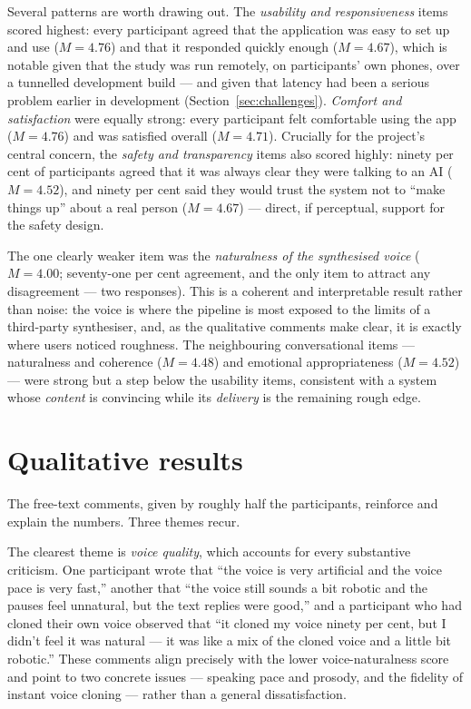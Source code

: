 \documentclass[11pt,a4paper]{report}
\begin{document}
Several patterns are worth drawing out. The \emph{usability and responsiveness} items scored highest: every participant agreed that the application was easy to set up and use ($M=4.76$) and that it responded quickly enough ($M=4.67$), which is notable given that the study was run remotely, on participants' own phones, over a tunnelled development build --- and given that latency had been a serious problem earlier in development (Section~\ref{sec:challenges}). \emph{Comfort and satisfaction} were equally strong: every participant felt comfortable using the app ($M=4.76$) and was satisfied overall ($M=4.71$). Crucially for the project's central concern, the \emph{safety and transparency} items also scored highly: ninety per cent of participants agreed that it was always clear they were talking to an AI ($M=4.52$), and ninety per cent said they would trust the system not to ``make things up'' about a real person ($M=4.67$) --- direct, if perceptual, support for the safety design.

The one clearly weaker item was the \emph{naturalness of the synthesised voice} ($M=4.00$; seventy-one per cent agreement, and the only item to attract any disagreement --- two responses). This is a coherent and interpretable result rather than noise: the voice is where the pipeline is most exposed to the limits of a third-party synthesiser, and, as the qualitative comments make clear, it is exactly where users noticed roughness. The neighbouring conversational items --- naturalness and coherence ($M=4.48$) and emotional appropriateness ($M=4.52$) --- were strong but a step below the usability items, consistent with a system whose \emph{content} is convincing while its \emph{delivery} is the remaining rough edge.

\section{Qualitative results}
\label{sec:eval-qual}
The free-text comments, given by roughly half the participants, reinforce and explain the numbers. Three themes recur.

The clearest theme is \emph{voice quality}, which accounts for every substantive criticism. One participant wrote that ``the voice is very artificial and the voice pace is very fast,'' another that ``the voice still sounds a bit robotic and the pauses feel unnatural, but the text replies were good,'' and a participant who had cloned their own voice observed that ``it cloned my voice ninety per cent, but I didn't feel it was natural --- it was like a mix of the cloned voice and a little bit robotic.'' These comments align precisely with the lower voice-naturalness score and point to two concrete issues --- speaking pace and prosody, and the fidelity of instant voice cloning --- rather than a general dissatisfaction.
\end{document}
